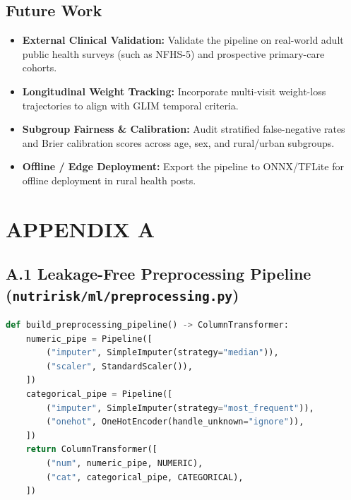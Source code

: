 \documentclass[12pt,a4paper]{report}
\begin{document}
\section{Future Work}
\begin{itemize}
    \item \textbf{External Clinical Validation:} Validate the pipeline on real-world adult public health surveys (such as NFHS-5) and prospective primary-care cohorts.
    \item \textbf{Longitudinal Weight Tracking:} Incorporate multi-visit weight-loss trajectories to align with GLIM temporal criteria.
    \item \textbf{Subgroup Fairness \& Calibration:} Audit stratified false-negative rates and Brier calibration scores across age, sex, and rural/urban subgroups.
    \item \textbf{Offline / Edge Deployment:} Export the pipeline to ONNX/TFLite for offline deployment in rural health posts.
\end{itemize}




\appendix

\chapter*{APPENDIX A}

\section*{A.1 Leakage-Free Preprocessing Pipeline (\texttt{nutririsk/ml/preprocessing.py})}
\begin{lstlisting}[language=Python]
def build_preprocessing_pipeline() -> ColumnTransformer:
    numeric_pipe = Pipeline([
        ("imputer", SimpleImputer(strategy="median")),
        ("scaler", StandardScaler()),
    ])
    categorical_pipe = Pipeline([
        ("imputer", SimpleImputer(strategy="most_frequent")),
        ("onehot", OneHotEncoder(handle_unknown="ignore")),
    ])
    return ColumnTransformer([
        ("num", numeric_pipe, NUMERIC),
        ("cat", categorical_pipe, CATEGORICAL),
    ])
\end{lstlisting}
\end{document}
